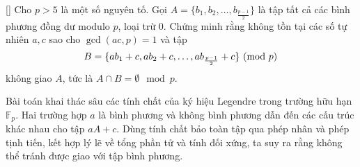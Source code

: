 \documentclass[../08-quadratic-residues.tex]{subfiles}
\begin{document}
\begin{example*}\label{example:IRN-2015-MO-N3}[\textbf{}]
	Cho \( p > 5 \) là một số nguyên tố. Gọi \( A = \{b_1, b_2, \dots, b_{\frac{p-1}{2}}\} \)
	là tập tất cả các bình phương đồng dư modulo \( p \), loại trừ 0.
	Chứng minh rằng không tồn tại các số tự nhiên \( a, c \) sao cho \( \gcd(ac, p) = 1 \) và tập
	\[
		B = \{ab_1 + c, ab_2 + c, \dots, ab_{\frac{p-1}{2}} + c\} \ (\mathrm{mod}\ p)
	\]
	không giao \( A \), tức là \( A \cap B = \emptyset \mod{p} \).
\end{example*}

\begin{story*}
	Bài toán khai thác sâu các tính chất của ký hiệu Legendre trong trường hữu hạn \( \mathbb{F}_p \). Hai trường hợp \( a \) là bình phương và không bình phương dẫn đến các cấu trúc khác nhau cho tập \( aA + c \). Dùng tính chất bảo toàn tập qua phép nhân và phép tịnh tiến, kết hợp lý lẽ về tổng phần tử và tính đối xứng, ta suy ra rằng không thể tránh được giao với tập bình phương.
\end{story*}

\bigbreak
\end{document}
